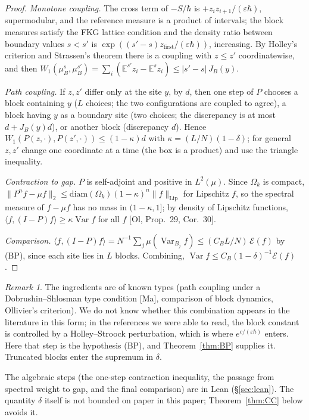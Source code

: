\documentclass[11pt,a4paper]{article}
\theoremstyle{definition}
\theoremstyle{remark}
\newtheorem{remark}[theorem]{Remark}
\newcommand{\E}{\mathbb{E}}
\newcommand{\Var}{\operatorname{Var}}
\newcommand{\cE}{\mathcal{E}}
\begin{document}
\begin{proof}
\emph{Monotone coupling.} The cross term of $-S/\hbar$ is $+z_iz_{i+1}/(\varepsilon\hbar)$, supermodular, and the reference measure is a product of intervals; the block measures satisfy the FKG lattice condition and the density ratio between boundary values $s<s'$ is $\exp((s'-s)z_{\mathrm{first}}/(\varepsilon\hbar))$, increasing. By Holley's criterion and Strassen's theorem there is a coupling with $z\le z'$ coordinatewise, and then $W_1(\mu_B^{s},\mu_B^{s'})=\sum_i(\E^{s'}z_i-\E^{s}z_i)\le|s'-s|\,J_B(y)$.

\emph{Path coupling.} If $z,z'$ differ only at the site $y$, by $d$, then one step of $P$ chooses a block containing $y$ ($L$ choices; the two configurations are coupled to agree), a block having $y$ as a boundary site (two choices; the discrepancy is at most $d+J_B(y)d$), or another block (discrepancy $d$). Hence $W_1(P(z,\cdot),P(z',\cdot))\le(1-\kappa)d$ with $\kappa=(L/N)(1-\delta)$; for general $z,z'$ change one coordinate at a time (the box is a product) and use the triangle inequality.

\emph{Contraction to gap.} $P$ is self-adjoint and positive in $L^2(\mu)$. Since $\Omega_k$ is compact, $\|P^nf-\mu f\|_2\le\mathrm{diam}(\Omega_k)(1-\kappa)^n\|f\|_{\mathrm{Lip}}$ for Lipschitz $f$, so the spectral measure of $f-\mu f$ has no mass in $(1-\kappa,1]$; by density of Lipschitz functions, $\langle f,(I-P)f\rangle\ge\kappa\Var f$ for all $f$ [Ol, Prop.~29, Cor.~30].

\emph{Comparison.} $\langle f,(I-P)f\rangle=N^{-1}\sum_j\mu(\Var_{B_j}f)\le(C_BL/N)\,\cE(f)$ by (BP), since each site lies in $L$ blocks. Combining, $\Var f\le C_B(1-\delta)^{-1}\cE(f)$.
\end{proof}

\begin{remark}
The ingredients are of known types (path coupling under a Dobrushin--Shlosman type condition [Ma], comparison of block dynamics, Ollivier's criterion). We do not know whether this combination appears in the literature in this form; in the references we were able to read, the block constant is controlled by a Holley--Stroock perturbation, which is where $e^{c/(\varepsilon\hbar)}$ enters. Here that step is the hypothesis (BP), and Theorem~\ref{thm:BP} supplies it. Truncated blocks enter the supremum in $\delta$.
\end{remark}

The algebraic steps (the one-step contraction inequality, the passage from spectral weight to gap, and the final comparison) are in Lean (\S\ref{sec:lean}). The quantity $\delta$ itself is not bounded on paper in this paper; Theorem~\ref{thm:CC} below avoids it.
\end{document}
